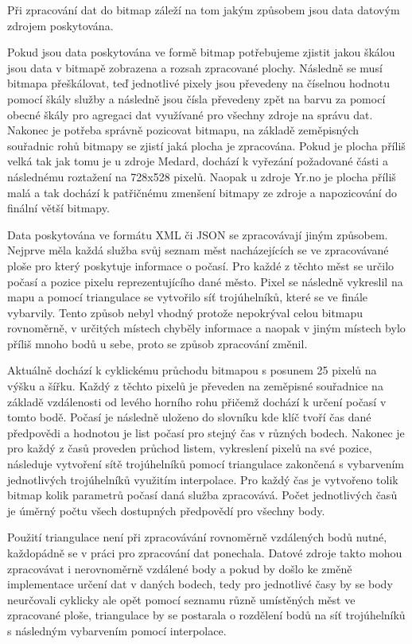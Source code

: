 \documentclass[czech,bachelor,dept460,male,csharp,cpdeclaration]{diploma}
\begin{document}
	Při zpracování dat do bitmap záleží na tom jakým způsobem jsou data datovým zdrojem poskytována.
	
	Pokud jsou data poskytována ve formě bitmap potřebujeme zjistit jakou škálou jsou data v bitmapě zobrazena a rozsah zpracované plochy. Následně se musí bitmapa přeškálovat, teď jednotlivé pixely jsou převedeny na číselnou hodnotu pomocí škály služby a následně jsou čísla převedeny zpět na barvu za pomocí obecné škály pro agregaci dat využívané pro všechny zdroje na správu dat. Nakonec je potřeba správně pozicovat bitmapu, na základě zeměpisných souřadnic rohů bitmapy se zjistí jaká plocha je zpracována. Pokud je plocha příliš velká tak jak tomu je u zdroje Medard, dochází k vyřezání požadované části a následnému roztažení na 728x528 pixelů. Naopak u zdroje Yr.no je plocha příliš malá a tak dochází k patřičnému zmenšení bitmapy ze zdroje a napozicování do finální větší bitmapy.
	
	Data poskytována ve formátu XML či JSON se zpracovávají jiným způsobem. Nejprve měla každá služba svůj seznam měst nacházejících se ve zpracovávané ploše pro který poskytuje informace o počasí. Pro každé z těchto měst se určilo počasí a 
	pozice pixelu reprezentujícího dané město. Pixel se následně vykreslil na mapu a pomocí triangulace se vytvořilo síť trojúhelníků, které se ve finále vybarvily. Tento způsob nebyl vhodný protože nepokrýval celou bitmapu rovnoměrně, v určitých místech chyběly informace a naopak v jiným místech bylo příliš mnoho bodů u sebe, proto se způsob zpracování změnil.
	
	Aktuálně dochází k cyklickému průchodu bitmapou s posunem 25 pixelů na výšku a šířku. Každý z těchto pixelů je převeden na zeměpisné souřadnice na základě vzdálenosti od levého horního rohu přičemž dochází k určení počasí v tomto bodě. Počasí je následně uloženo do slovníku kde klíč tvoří čas dané předpovědi a hodnotou je list počasí pro stejný čas v různých bodech. Nakonec je pro každý z časů proveden průchod listem, vykreslení pixelů na své pozice, následuje vytvoření sítě trojúhelníků pomocí triangulace zakončená s vybarvením jednotlivých trojúhelníků využitím interpolace. Pro každý čas je vytvořeno tolik bitmap kolik parametrů počasí daná služba zpracovává. Počet jednotlivých časů je úměrný počtu všech dostupných předpovědí pro všechny body.
	
	Použití triangulace není při zpracovávání rovnoměrně vzdálených bodů nutné, každopádně se v práci pro zpracování dat ponechala. Datové zdroje takto mohou zpracovávat i nerovnoměrně vzdálené body a pokud by došlo ke změně implementace určení dat v daných bodech, tedy pro jednotlivé časy by se body neurčovali cyklicky ale opět pomocí seznamu různě umístěných měst ve zpracované ploše, triangulace by se postarala o rozdělení bodů na síť trojúhelníků s následným vybarvením pomocí interpolace.
	
\end{document}
